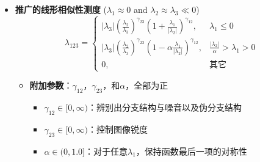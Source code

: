\begin{frame}
\begin{itemize}
\item \textbf{推广的线形相似性测度} (\alert{$\lambda_1 \approx 0$ and $\lambda_2 \approx \lambda_3 \ll 0$})
\pause \begin{equation*}
\lambda_{123} =
\begin{cases}
\left| \lambda_3 \right| \left( \frac{\lambda_2}{\lambda_3} \right)^{\gamma_{23}} \left( 1 + \frac{\lambda_1}{\left| \lambda_2 \right|} \right)^{\gamma_{12}},        & \lambda_1 \le 0 \\%
\left| \lambda_3 \right| \left( \frac{\lambda_2}{\lambda_3} \right)^{\gamma_{23}} \left( 1 - \alpha \frac{\lambda_1}{\left| \lambda_2 \right|} \right)^{\gamma_{12}}, & \frac{\left| \lambda_2 \right|}{\alpha} > \lambda_1 > 0 \\%
0,                                                                                                                                                                    & \text{其它} %
\end{cases}
\end{equation*}
\begin{itemize}
\pause \item \textbf{附加参数}：$\gamma_{12}$，$\gamma_{23}$，和$\alpha$，全部为正
\begin{itemize}
\item $\gamma_{12} \in [0, \infty)$：辨别出分支结构与噪音以及伪分支结构
\item $\gamma_{23} \in [0, \infty)$：控制图像锐度
\item $\alpha \in (0, 1.0]$：对于任意$\lambda_1$，保持函数最后一项的对称性
\end{itemize}
\end{itemize}
\end{itemize}
\end{frame}

